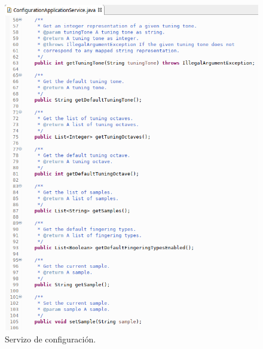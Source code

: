    \begin{figure}[htbp]
    \centering
    \includegraphics[scale=0.6, keepaspectratio=true]{./imagenes/servizo-configuracion-2.png}
    \caption{Servizo de configuración.}
    \label{figura:ServizoConfiguracion2}
   \end{figure}
   
